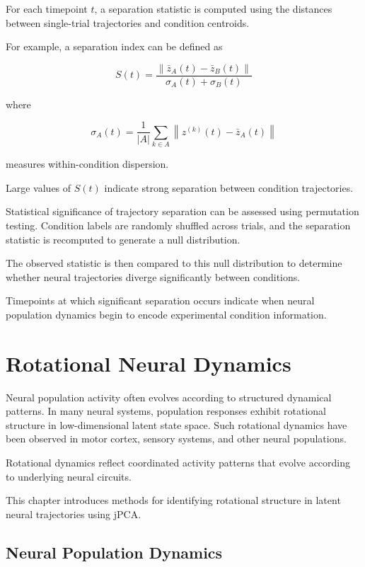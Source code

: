 \documentclass[11pt]{report}
\begin{document}
For each timepoint $t$, a separation statistic is computed using
the distances between single-trial trajectories and condition
centroids.

For example, a separation index can be defined as

\begin{equation}
S(t) =
\frac{
\left\|
\bar{z}_{A}(t) - \bar{z}_{B}(t)
\right\|
}{
\sigma_A(t) + \sigma_B(t)
}
\end{equation}

where

\begin{equation}
\sigma_A(t) =
\frac{1}{|A|}
\sum_{k \in A}
\left\|
z^{(k)}(t) - \bar{z}_A(t)
\right\|
\end{equation}

measures within-condition dispersion.

Large values of $S(t)$ indicate strong separation between
condition trajectories.

Statistical significance of trajectory separation can be assessed
using permutation testing. Condition labels are randomly shuffled
across trials, and the separation statistic is recomputed to
generate a null distribution.

The observed statistic is then compared to this null distribution
to determine whether neural trajectories diverge significantly
between conditions.

Timepoints at which significant separation occurs indicate when
neural population dynamics begin to encode experimental condition
information.

\chapter{Rotational Neural Dynamics}

Neural population activity often evolves according to structured
dynamical patterns. In many neural systems, population responses
exhibit rotational structure in low-dimensional latent state space.
Such rotational dynamics have been observed in motor cortex,
sensory systems, and other neural populations.

Rotational dynamics reflect coordinated activity patterns that
evolve according to underlying neural circuits.

This chapter introduces methods for identifying rotational
structure in latent neural trajectories using jPCA.

\section{Neural Population Dynamics}
\end{document}
